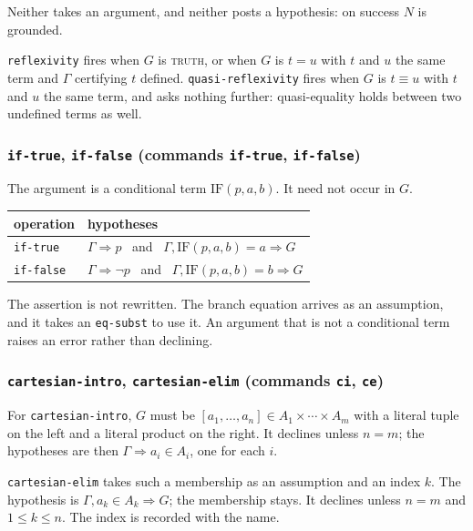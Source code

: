 Neither takes an argument, and neither posts a hypothesis: on success $N$
is grounded.

\texttt{reflexivity} fires when $G$ is \textsc{truth}, or when $G$ is
$t = u$ with $t$ and $u$ the same term and $\Gamma$ certifying $t$
defined.  \texttt{quasi-reflexivity} fires when $G$ is $t \equiv u$ with
$t$ and $u$ the same term, and asks nothing further: quasi-equality holds
between two undefined terms as well.

\subsubsection*{\texttt{if-true}, \texttt{if-false}
  (commands \texttt{if-true}, \texttt{if-false})}

The argument is a conditional term $\mathrm{IF}(p, a, b)$.  It need not
occur in $G$.

\begin{center}
\begin{tabular}{@{}ll@{}}
\toprule
operation & hypotheses \\
\midrule
\texttt{if-true}  & $\Gamma \Longrightarrow p$ \ and \ $\Gamma, \mathrm{IF}(p,a,b) = a \Longrightarrow G$ \\
\texttt{if-false} & $\Gamma \Longrightarrow \neg p$ \ and \ $\Gamma, \mathrm{IF}(p,a,b) = b \Longrightarrow G$ \\
\bottomrule
\end{tabular}
\end{center}

The assertion is not rewritten.  The branch equation arrives as an
assumption, and it takes an \texttt{eq-subst} to use it.  An argument
that is not a conditional term raises an error rather than declining.

\subsubsection*{\texttt{cartesian-intro}, \texttt{cartesian-elim}
  (commands \texttt{ci}, \texttt{ce})}

For \texttt{cartesian-intro}, $G$ must be
$[a_1, \ldots, a_n] \in A_1 \times \cdots \times A_m$ with a literal
tuple on the left and a literal product on the right.  It declines unless
$n = m$; the hypotheses are then $\Gamma \Longrightarrow a_i \in A_i$,
one for each $i$.

\texttt{cartesian-elim} takes such a membership as an assumption and an
index $k$.  The hypothesis is
$\Gamma, a_k \in A_k \Longrightarrow G$; the membership stays.  It
declines unless $n = m$ and $1 \leq k \leq n$.  The index is recorded
with the name.

